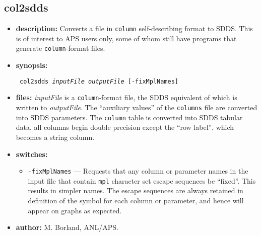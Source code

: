 \begin{latexonly}
\newpage
\end{latexonly}
\subsection{col2sdds}
\label{col2sdds}

\begin{itemize}
\item {\bf description:}
Converts a file in \verb|column| self-describing format to SDDS.  This is of interest to
APS users only, some of whom still have programs that generate \verb|column|-format files.
\item {\bf synopsis:} 
\begin{flushleft}{\tt
col2sdds {\em inputFile} {\em outputFile} [-fixMplNames]
}\end{flushleft}
\item {\bf files:}
{\em inputFile} is a {\tt column}-format file, the SDDS equivalent of which is written to {\em outputFile}.
The ``auxiliary values'' of the {\tt columns} file are converted into SDDS parameters.  The {\tt column} table
is converted into SDDS tabular data, all columns begin double precision except the ``row label'', which
becomes a string column.
\item {\bf switches:}
    \begin{itemize}
    \item \verb|-fixMplNames| --- Requests that any column or parameter names in the input file that contain
        \verb|mpl| character set escape sequences be ``fixed''.  This results in simpler names.  The escape sequences
        are always retained in definition of the symbol for each column or parameter, and hence will appear on
        graphs as expected.
    \end{itemize}
\item {\bf author:} M. Borland, ANL/APS.
\end{itemize}

